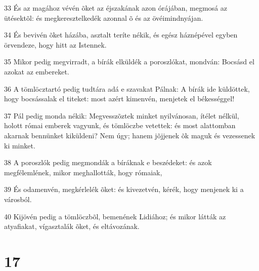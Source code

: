 \par 33 És az magához vévén õket az éjszakának azon órájában, megmosá az ütésektõl: és megkeresztelkedék azonnal õ és az övéimindnyájan.
\par 34 És bevivén õket házába, asztalt teríte nékik, és egész háznépével egyben örvendeze, hogy hitt az Istennek.
\par 35 Mikor pedig megvirradt, a bírák elküldék a poroszlókat, mondván: Bocsásd el azokat az embereket.
\par 36 A tömlöcztartó pedig tudtára adá e szavakat Pálnak: A bírák ide küldöttek, hogy bocsássalak el titeket: most azért kimenvén, menjetek el békességgel!
\par 37 Pál pedig monda nékik: Megvesszõztek minket nyilvánosan, ítélet nélkül, holott római emberek vagyunk, és tömlöczbe vetettek: és most alattomban akarnak bennünket kiküldeni? Nem úgy; hanem jõjjenek õk maguk és vezessenek ki minket.
\par 38 A poroszlók pedig megmondák a bíráknak e beszédeket: és azok megfélemlének, mikor meghallották, hogy rómaiak,
\par 39 És odamenvén, megkérlelék õket: és kivezetvén, kérék, hogy menjenek ki a városból.
\par 40 Kijövén pedig a tömlöczbõl, bemenének Lidiához; és mikor látták az atyafiakat, vígasztalák õket, és eltávozának.

\chapter{17}


